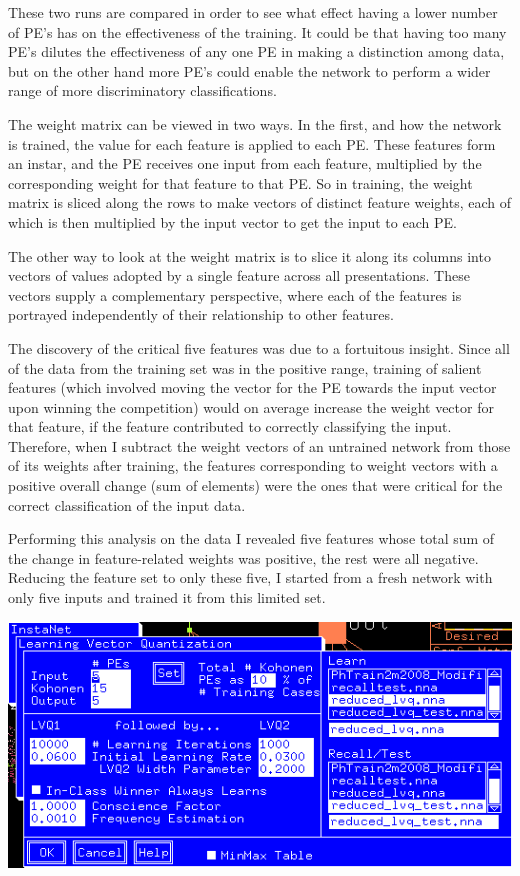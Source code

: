 \documentclass[12pt]{article}
\begin{document}
These two runs are compared in order to see what effect having a lower number of PE's has on the effectiveness of the training.  It could be that having too many PE's dilutes the effectiveness of any one PE in making a distinction among data, but on the other hand more PE's could enable the network to perform a wider range of more discriminatory classifications.  

The weight matrix can be viewed in two ways.  In the first, and how the network is trained, the value for each feature is applied to each PE.  These features form an instar, and the PE receives one input from each feature, multiplied by the corresponding weight for that feature to that PE.  So in training, the weight matrix is sliced along the rows to make vectors of distinct feature weights, each of which is then multiplied by the input vector to get the input to each PE.

The other way to look at the weight matrix is to slice it along its columns into vectors of values adopted by a single feature across all presentations.  These vectors supply a complementary perspective, where each of the features is portrayed independently of their relationship to other features.  

The discovery of the critical five features was due to a fortuitous insight.  Since all of the data from the training set was in the positive range, training of salient features (which involved moving the vector for the PE towards the input vector upon winning the competition) would on average increase the weight vector for that feature, if the feature contributed to correctly classifying the input.  Therefore, when I subtract the weight vectors of an untrained network from those of its weights after training, the features corresponding to weight vectors with a positive overall change (sum of elements) were the ones that were critical for the correct classification of the input data.    

Performing this analysis on the data I revealed five features whose total sum of the change in feature-related weights was positive, the rest were all negative.  Reducing the feature set to only these five, I started from a fresh network with only five inputs and trained it from this limited set.  

\begin{center}
\includegraphics[scale=0.7]{parameters5features.png}
\end{center}
\end{document}
